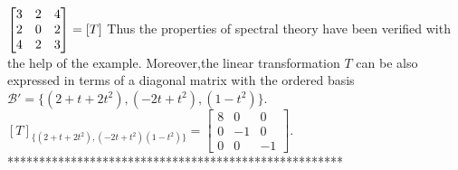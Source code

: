 \documentclass[12pt]{article}
\theoremstyle{definition}
\begin{document}
	  $
	  \begin{bmatrix}
	  3 & 2 & 4\\
	  2 & 0 & 2\\
	  4 & 2 & 3
	  \end{bmatrix} = [T]
	  \\
	  $
	  Thus the properties of spectral theory have been verified with the help of the example.
	  Moreover,the linear transformation $T$ can be also expressed in terms of a diagonal matrix with the ordered basis $\mathcal{B\prime}=\{(2+t+2t^2),(-2t+t^2),(1-t^2)\}$.
	  $
	  {[T]}_{\{(2+t+2t^2),(-2t+t^2)(1-t^2)\}} = 
	  \begin{bmatrix}
	  8 & 0 & 0\\
	  0 & -1 & 0\\
	  0 & 0 & -1
	  \end{bmatrix}
	  $.
	  \\
	  *****************************************************
\end{document}
